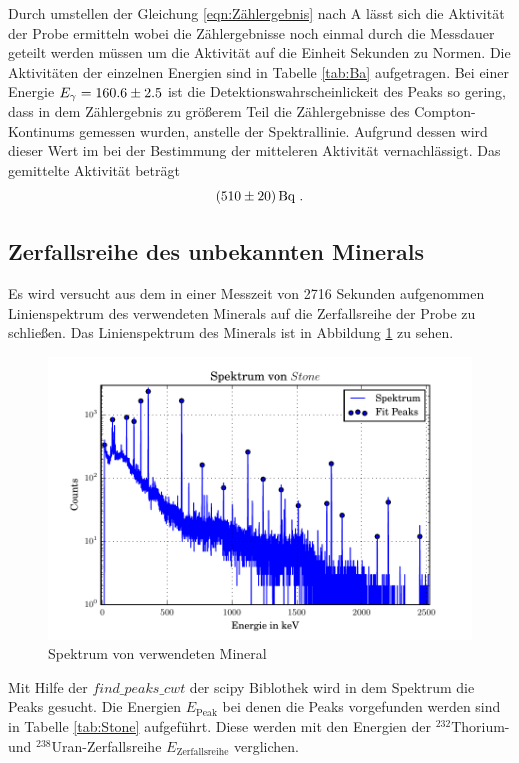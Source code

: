 Durch umstellen der Gleichung \ref{eqn:Zählergebnis} nach A lässt sich die Aktivität der Probe ermitteln wobei die Zählergebnisse noch einmal durch die Messdauer geteilt werden müssen um die Aktivität auf die Einheit Sekunden zu Normen. Die Aktivitäten der einzelnen Energien sind in Tabelle \ref{tab:Ba} aufgetragen. Bei einer Energie $E_\gamma = \num{160.6 +- 2.5}$ ist die Detektionswahrscheinlickeit des Peaks so gering, dass in dem  Zählergebnis zu größerem Teil die Zählergebnisse des Compton-Kontinums gemessen wurden, anstelle der Spektrallinie. Aufgrund dessen wird dieser Wert im bei der Bestimmung der mitteleren Aktivität vernachlässigt. Das gemittelte Aktivität beträgt
\begin{equation} 
  (\num{510 +- 20}) \, \text{Bq} \ .
  \label{eqn:aktBq}
\end{equation}
\subsection{Zerfallsreihe des unbekannten Minerals}
Es wird versucht aus dem in einer Messzeit von 2716 Sekunden aufgenommen Linienspektrum des verwendeten Minerals auf die Zerfallsreihe der Probe zu schließen. Das Linienspektrum des Minerals ist in Abbildung \ref{fig:Stone} zu sehen.
\begin{figure}[H]
  \centering
  \includegraphics[width=\textwidth]{./build/SpektSt.pdf}
  \caption{Spektrum von verwendeten Mineral}
  \label{fig:Stone}
\end{figure}
Mit Hilfe der $find\_peaks\_cwt$ der scipy Biblothek wird in dem Spektrum die Peaks gesucht. Die Energien $E_\text{Peak}$ bei denen die Peaks vorgefunden werden sind in Tabelle \ref{tab:Stone} aufgeführt. Diese werden mit den Energien der $^{232}$Thorium- und $^{238}$Uran-Zerfallsreihe $E_\text{Zerfallsreihe}$ verglichen. 
